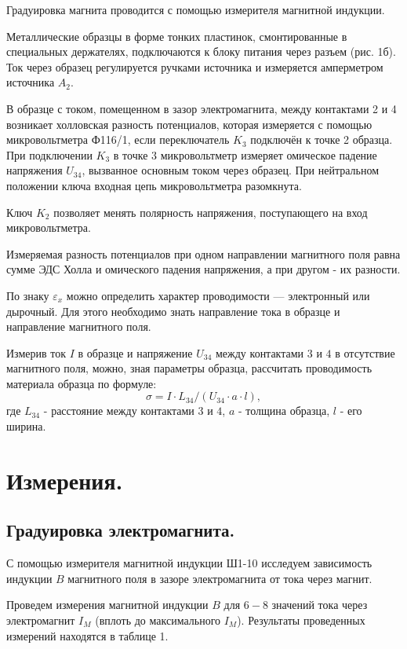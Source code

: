 \documentclass[12pt,a4paper]{article}
\begin{document}
        Градуировка магнита проводится с помощью измерителя магнитной индукции.
        
        Металлические образцы в форме тонких пластинок, смонтированные в специальных держателях, подключаются к блоку питания через разъем (рис. 1б). Ток через образец регулируется ручками источника и измеряется амперметром источника $A_2$.
        
        В образце с током, помещенном в зазор электромагнита, между контактами 2 и 4 возникает холловская разность потенциалов, которая измеряется с помощью микровольтметра Ф116/1, если переключатель $K_3$ подключён к точке 2 образца. При подключении $K_3$ в точке $3$ микровольтметр измеряет омическое падение напряжения $U_{34}$, вызванное основным током через образец. При нейтральном положении ключа входная цепь микровольтметра разомкнута.

        Ключ $K_2$ позволяет менять полярность напряжения, поступающего на вход микровольтметра.
        
        Измеряемая разность потенциалов при одном направлении магнитного поля равна сумме ЭДС Холла и омического падения напряжения, а при другом - их разности.
        
        По знаку $\varepsilon_x$ можно определить характер проводимости --- электронный или дырочный. Для этого необходимо знать направление тока в образце и направление магнитного поля.
        
        Измерив ток $I$ в образце и напряжение $U_{34}$ между контактами $3$ и $4$ в отсутствие магнитного поля, можно, зная параметры образца, рассчитать проводимость материала образца по формуле:
        \[
        \sigma = I \cdot L_{34}/(U_{34}\cdot a \cdot l),
        \]
        где $L_{34}$ - расстояние между контактами $3$ и $4$, $a$ - толщина образца, $l$ - его ширина.
        
\newpage
\section{Измерения.}
    \subsection{Градуировка электромагнита.}
        С помощью измерителя магнитной индукции Ш1-10 исследуем зависимость индукции $B$ магнитного поля в зазоре электромагнита от тока через магнит.
        
        Проведем измерения магнитной индукции $B$ для $6-8$ значений тока через электромагнит $I_M$ (вплоть до максимального $I_M$). Результаты проведенных измерений находятся в таблице 1.
        
\end{document}

